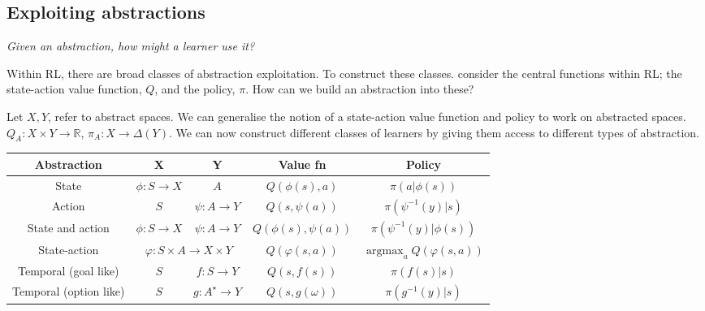 \subsection{Exploiting abstractions}\label{exploit-abstraction-rl}

%

\begin{displayquote}
\textit{Given an abstraction, how might a learner use it?}
\end{displayquote}

Within RL, there are broad classes of abstraction exploitation. To construct these classes.
consider the central functions within RL; the state-action value function, $Q$, and the policy, $\pi$.
How can we build an abstraction into these?

Let $X, Y$, refer to abstract spaces. We can generalise the notion of a state-action value function and policy to work on abstracted spaces.
$Q_A: X \times Y \to \mathbb R$, $\pi_A: X \to \Delta(Y)$. We can now construct
different classes of learners by giving them access to different types of abstraction.

\vspace{5mm}

\begin{changemargin}{-2cm}{-2cm}
  \begin{center}
    \begin{tabular}{ c || c | c | c | c }
      Abstraction & \textbf{X} & \textbf{Y} & \textbf{Value fn} & \textbf{Policy} \\ \hline \hline
      State & $\phi: S \to X$ & $A$ & $Q(\phi(s), a)$ & $\pi(a| \phi(s))$ \\ \hline
      Action & $S$ & $\psi: A \to Y$ & $Q(s, \psi(a))$ & $\pi(\psi^{-1}(y) | s)$\\ \hline
      State and action \footnotemark[5] & $\phi: S \to X$ & $\psi: A \to Y$ & $Q(\phi(s), \psi(a))$ & $\pi(\psi^{-1}(y) | \phi(s))$ \\ \hline
      State-action & \multicolumn{2}{c|}{$\varphi: S\times A \to X\times Y$} & $Q(\varphi(s, a))$ & $\mathop{\text{argmax}}_a Q(\varphi(s, a))$ \\ \hline
      Temporal (goal like)\footnotemark[10] & $S$ & $f: S \to Y$ & $Q(s, f(s))$ &  $\pi(f(s)|s)$ \\ \hline
      Temporal (option like) & $S$ & $g: A^{\star} \to Y$ & $Q(s, g(\omega))$ & $\pi(g^{-1}(y) | s)$ \\ \hline
    \end{tabular}
  \end{center}
\end{changemargin}

